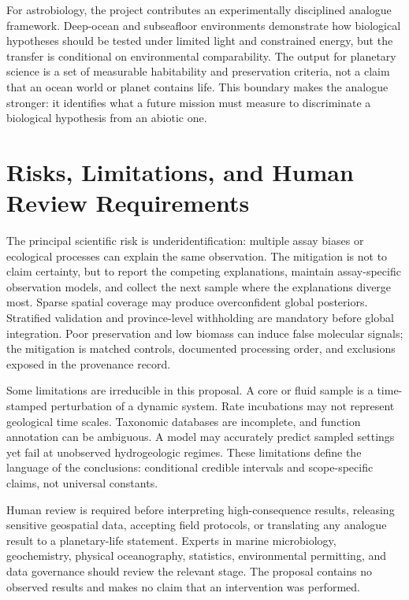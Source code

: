 \documentclass[conference]{../../../../Conference-LaTeX-template_10-17-19/IEEEtran}
\begin{document}
For astrobiology, the project contributes an experimentally disciplined analogue framework. Deep-ocean and subseafloor environments demonstrate how biological hypotheses should be tested under limited light and constrained energy, but the transfer is conditional on environmental comparability. The output for planetary science is a set of measurable habitability and preservation criteria, not a claim that an ocean world or planet contains life. This boundary makes the analogue stronger: it identifies what a future mission must measure to discriminate a biological hypothesis from an abiotic one.

\section{Risks, Limitations, and Human Review Requirements}
The principal scientific risk is underidentification: multiple assay biases or ecological processes can explain the same observation. The mitigation is not to claim certainty, but to report the competing explanations, maintain assay-specific observation models, and collect the next sample where the explanations diverge most. Sparse spatial coverage may produce overconfident global posteriors. Stratified validation and province-level withholding are mandatory before global integration. Poor preservation and low biomass can induce false molecular signals; the mitigation is matched controls, documented processing order, and exclusions exposed in the provenance record.

Some limitations are irreducible in this proposal. A core or fluid sample is a time-stamped perturbation of a dynamic system. Rate incubations may not represent geological time scales. Taxonomic databases are incomplete, and function annotation can be ambiguous. A model may accurately predict sampled settings yet fail at unobserved hydrogeologic regimes. These limitations define the language of the conclusions: conditional credible intervals and scope-specific claims, not universal constants.

Human review is required before interpreting high-consequence results, releasing sensitive geospatial data, accepting field protocols, or translating any analogue result to a planetary-life statement. Experts in marine microbiology, geochemistry, physical oceanography, statistics, environmental permitting, and data governance should review the relevant stage. The proposal contains no observed results and makes no claim that an intervention was performed.
\end{document}
